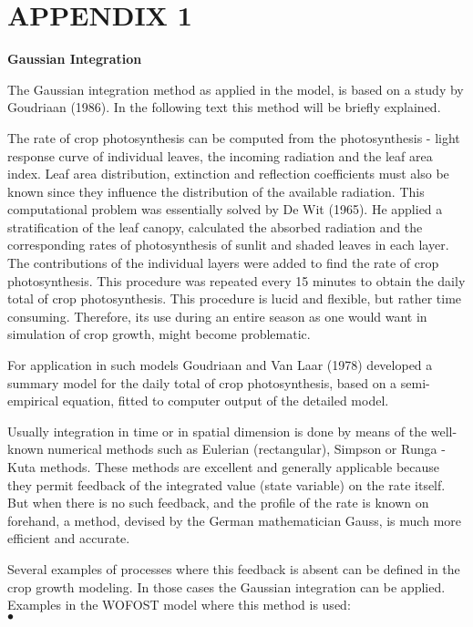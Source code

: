 \documentclass[11pt]{article}
\begin{document}
\setcounter{page}{118}\pagenumpos{\pnbr}
\section{  APPENDIX 1  } 

\bigskip
{\bf {\large Gaussian Integration}}

The Gaussian integration method as applied in the model, is based on a study by Goudriaan
(1986). In the following text this method will be briefly explained.

The rate of crop photosynthesis can be computed from the photosynthesis - light response
curve of individual leaves, the incoming radiation and the leaf area index. Leaf area
distribution, extinction and reflection coefficients must also be known since they influence
the distribution of the available radiation. This computational problem was essentially solved
by De Wit (1965). He applied a stratification of the leaf canopy, calculated the absorbed
radiation and the corresponding rates of photosynthesis of sunlit and shaded leaves in each
layer. The contributions of the individual layers  were added to find the rate of crop
photosynthesis. This procedure was repeated every 15 minutes to obtain the daily total of
crop photosynthesis. This procedure is lucid and flexible, but rather time consuming.
Therefore, its use during an entire season as one would want in simulation of crop growth,
might become problematic.

For application in such models Goudriaan and Van Laar (1978) developed a summary model
for the daily total of crop photosynthesis, based on a semi-empirical equation, fitted to
computer output of the detailed model.

Usually integration in time or in spatial dimension is done by means of the well-known
numerical methods such as Eulerian (rectangular), Simpson or Runga - Kuta methods. These
methods are excellent and generally applicable because they permit feedback of the
integrated value (state variable) on the rate itself. But when there is no such feedback, and
the profile of the rate is known on forehand, a method, devised by the German
mathematician Gauss, is much more efficient and accurate. 

Several examples of processes where this feedback is absent can be defined in the crop
growth modeling. In those cases the Gaussian integration can be applied. Examples in the
WOFOST model where this method is used: \\
$\bullet$
\testlastline
\end{document}

